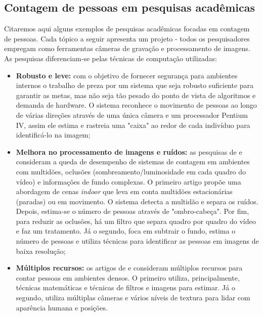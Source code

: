 \subsection{Contagem de pessoas em pesquisas acadêmicas}
Citaremos aqui alguns exemplos de pesquisas acadêmicas focadas em contagem de pessoas. Cada tópico a seguir apresenta um projeto - todos os pesquisadores empregam como ferramentas câmeras de gravação e processamento de imagens. As pesquisas diferenciam-se pelas técnicas de computação utilizadas:

\begin{itemize}

  \item \textbf{Robusto e leve:} com o objetivo de fornecer segurança para ambientes internos o trabalho de  preza por um sistema que seja robusto suficiente para garantir as metas, mas não seja tão pesado do ponto de vista de algoritmos e demanda de hardware. O sistema reconhece o movimento de pessoas ao longo de várias direções através de uma única câmera e um processador Pentium IV, assim ele estima e rastreia uma "caixa" ao redor de cada indivíduo para identificá-lo na imagem;

  \item \textbf{Melhora no processamento de imagens e ruídos:} as pesquisas de  e  consideram a queda de desempenho de sistemas de contagem em ambientes com multidões, oclusões (sombreamento/luminosidade em cada quadro do vídeo) e informações de fundo complexas. O primeiro artigo propõe uma abordagem de cenas \emph{indoor} que leva em conta multidões estacionárias (paradas) ou em movimento. O sistema detecta a multidão e separa os ruídos. Depois, estima-se o número de pessoas através de "ombro-cabeça". Por fim, para reduzir as oclusões, há um filtro que separa quadro por quadro do vídeo e faz um tratamento. Já o segundo, foca em subtrair o fundo, estima o número de pessoas e utiliza técnicas para identificar as pessoas em imagens de baixa resolução;

  \item \textbf{Múltiplos recursos:} os artigos de  e  consideram múltiplos recursos para contar pessoas em ambientes densos. O primeiro utiliza, principalmente, técnicas matemáticas e técnicas de filtros e imagens para estimar. Já o segundo, utiliza
  múltiplas câmeras e vários níveis de textura para lidar com aparência humana e posições.

\end{itemize}

